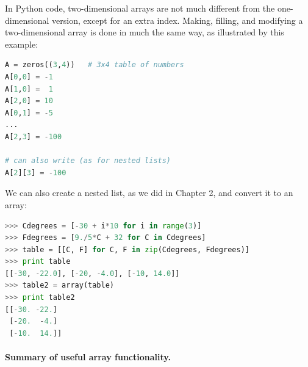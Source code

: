 \documentclass[graybox,envcountchap,sectrefs,final]{svmonodo}
\begin{document}
In Python code, two-dimensional arrays are not much different from the one-dimensional version, except for an extra index.
Making, filling, and modifying a two-dimensional array is done in much the same way, as illustrated by this example:
\begin{lstlisting}[language=Python,style=blue1]
A = zeros((3,4))   # 3x4 table of numbers
A[0,0] = -1
A[1,0] =  1
A[2,0] = 10
A[0,1] = -5
...
A[2,3] = -100

# can also write (as for nested lists)
A[2][3] = -100
\end{lstlisting}
We can also create a nested list, as we did in Chapter 2, and convert it to an array:
\begin{lstlisting}[language=Python,style=blue1]
>>> Cdegrees = [-30 + i*10 for i in range(3)]
>>> Fdegrees = [9./5*C + 32 for C in Cdegrees]
>>> table = [[C, F] for C, F in zip(Cdegrees, Fdegrees)]
>>> print table
[[-30, -22.0], [-20, -4.0], [-10, 14.0]]
>>> table2 = array(table)
>>> print table2
[[-30. -22.]
 [-20.  -4.]
 [-10.  14.]]
\end{lstlisting}

\paragraph{Summary of useful array functionality.}
\end{document}
